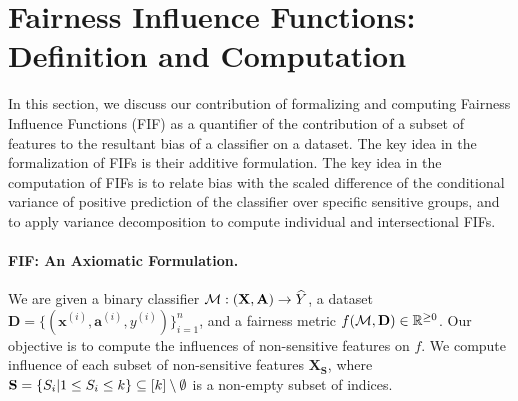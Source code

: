 \section{Fairness Influence Functions: Definition and Computation}\label{sec:fifs}
In this section, we discuss our contribution of formalizing and computing Fairness Influence Functions (FIF) as a quantifier of the contribution of a subset of features to the resultant bias of a classifier on a dataset. The key idea in the formalization of FIFs is their additive formulation. The key idea in the computation of FIFs is to relate bias with the scaled difference of the conditional variance of positive prediction of the classifier over specific sensitive groups, and to apply variance decomposition to compute individual and intersectional FIFs. %

\paragraph{FIF: An Axiomatic Formulation.} We are given a binary classifier  $\mathcal{M}: (\mathbf{X}, \mathbf{A}) \rightarrow \widehat{Y} $, a dataset $ \mathbf{D} = \{(\mathbf{x}^{(i)}, \mathbf{a}^{(i)}, y^{(i)})\}_{i=1}^n $, and a  fairness metric $ f(\mathcal{M}, \mathbf{D}) \in \mathbb{R}^{\geq 0} $. Our objective is to compute the influences of non-sensitive features on $ f $. We compute influence of each subset of non-sensitive features $ \mathbf{X}_{\mathbf{S}} $, where $ \mathbf{S} = \{S_i | 1 \le S_i \le k\} \subseteq [k] \setminus \emptyset $ is a non-empty subset of indices. 

